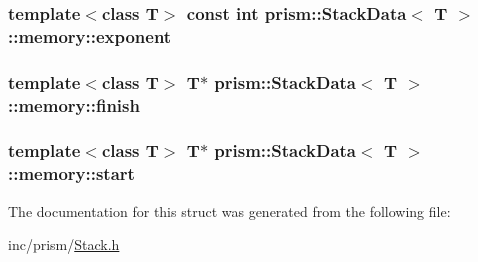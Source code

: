 \subsubsection[{\texorpdfstring{exponent}{exponent}}]{\setlength{\rightskip}{0pt plus 5cm}template$<$class T$>$ const int {\bf prism\+::\+Stack\+Data}$<$ T $>$\+::memory\+::exponent}\hypertarget{structprism_1_1_stack_data_1_1memory_a9a913ff54f45bd93a8ea88d009135533}{}\label{structprism_1_1_stack_data_1_1memory_a9a913ff54f45bd93a8ea88d009135533}
\subsubsection[{\texorpdfstring{finish}{finish}}]{\setlength{\rightskip}{0pt plus 5cm}template$<$class T$>$ T$\ast$ {\bf prism\+::\+Stack\+Data}$<$ T $>$\+::memory\+::finish}\hypertarget{structprism_1_1_stack_data_1_1memory_aeeae0886f3cfbe168999abba59314045}{}\label{structprism_1_1_stack_data_1_1memory_aeeae0886f3cfbe168999abba59314045}
\subsubsection[{\texorpdfstring{start}{start}}]{\setlength{\rightskip}{0pt plus 5cm}template$<$class T$>$ T$\ast$ {\bf prism\+::\+Stack\+Data}$<$ T $>$\+::memory\+::start}\hypertarget{structprism_1_1_stack_data_1_1memory_ac9148f9565f189adfe116b5690800a2c}{}\label{structprism_1_1_stack_data_1_1memory_ac9148f9565f189adfe116b5690800a2c}


The documentation for this struct was generated from the following file\+:\begin{DoxyCompactItemize}
\item 
inc/prism/\hyperlink{_stack_8h}{Stack.\+h}\end{DoxyCompactItemize}
